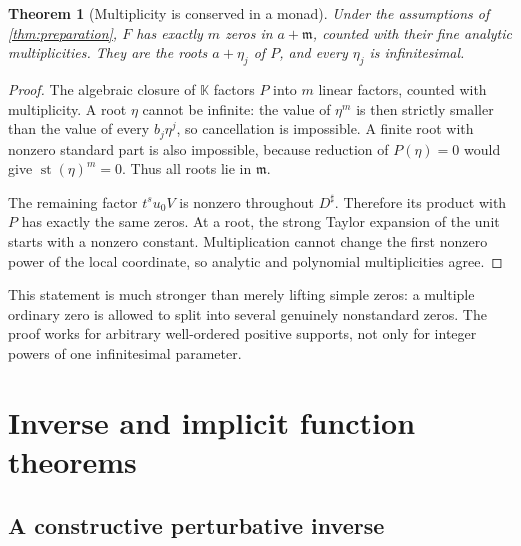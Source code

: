 \documentclass[11pt,letterpaper]{article}
\numberwithin{equation}{section}
\newtheorem{theorem}{Theorem}[section]
\theoremstyle{definition}
\theoremstyle{remark}
\newcommand{\K}{\mathbb{K}}
\newcommand{\mm}{\mathfrak{m}}
\newcommand{\st}{\operatorname{st}}
\begin{document}
\begin{theorem}[Multiplicity is conserved in a monad]\label{thm:zerolifting}
Under the assumptions of \cref{thm:preparation}, $F$ has exactly $m$ zeros in
$a+\mm$, counted with their fine analytic multiplicities. They are the roots
$a+\eta_j$ of $P$, and every $\eta_j$ is infinitesimal.
\end{theorem}
\begin{proof}
The algebraic closure of $\K$ factors $P$ into $m$ linear factors, counted
with multiplicity. A root $\eta$ cannot be infinite: the value of $\eta^m$
is then strictly smaller than the value of every $b_j\eta^j$, so cancellation
is impossible. A finite root with nonzero standard part is also impossible,
because reduction of $P(\eta)=0$ would give $\st(\eta)^m=0$.
Thus all roots lie in $\mm$.

The remaining factor $t^s u_0V$ is nonzero throughout $D^\sharp$. Therefore
its product with $P$ has exactly the same zeros. At a root, the strong Taylor
expansion of the unit starts with a nonzero constant. Multiplication cannot
change the first nonzero power of the local coordinate, so analytic and
polynomial multiplicities agree.
\end{proof}

This statement is much stronger than merely lifting simple zeros: a multiple
ordinary zero is allowed to split into several genuinely nonstandard zeros.
The proof works for arbitrary well-ordered positive supports, not only for
integer powers of one infinitesimal parameter.

\section{Inverse and implicit function theorems}\label{sec:inverse}

\subsection{A constructive perturbative inverse}
\end{document}
